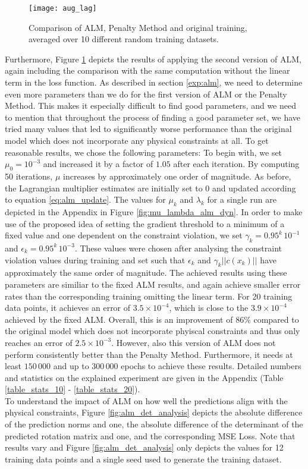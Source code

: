 \begin{figure}[H]
	\texttt{[image: aug\_lag]}
	\caption{Comparison of ALM, Penalty Method and original training, averaged over 10 different random training datasets.}
	\label{fig:aug_lag}
\end{figure}
Furthermore, Figure \ref{fig:aug_lag} depicts the results of applying the second version of ALM, again including the comparison with the same computation without the linear term in the loss function. As described in section \ref{exp:alm}, we need to determine even more parameters than we do for the first version of ALM or the Penalty Method. This makes it especially difficult to find good parameters, and we need to mention that throughout the process of finding a good parameter set, we have tried many values that led to significantly worse performance than the original model which does not incorporate any physical constraints at all. To get reasonable results, we chose the following parameters: To begin with, we set $\mu_{0} = 10^{-3}$ and increased it by a factor of $1.05$ after each iteration. By computing 50 iterations, $\mu$ increases by approximately one order of magnitude. As before, the Lagrangian multiplier estimates are initially set to $0$ and updated according to equation \eqref{eq:alm_update}. The values for $\mu_k$ and $\lambda_k$ for a single run are depicted in the Appendix in Figure \ref{fig:mu_lambda_alm_dyn}. In order to make use of the proposed idea of setting the gradient threshold to a minimum of a fixed value and one dependent on the constraint violation, we set $\gamma_k = 0.95^k\,10^{-1}$ and $\epsilon_k = 0.95^k\,10^{-3}$. These values were chosen after analysing the constraint violation values during training and set such that $\epsilon_k$ and $\gamma_k ||c(x_k)||$ have approximately the same order of magnitude. The achieved results using these parameters are similiar to the fixed ALM results, and again achieve smaller error rates than the corresponding training omitting the linear term. For 20 training data points, it achieves an error of $3.5\times 10^{-4}$, which is close to the $3.9 \times 10^{-4}$ achieved by the fixed ALM. Overall, this is an improvement of $86\%$ compared to the original model which does not incorporate phyiscal constraints and thus only reaches an error of $2.5\times 10^{-3}$. However, also this version of ALM does not perform consistently better than the Penalty Method. Furthermore, it needs at least $150\,000$ and up to $300\,000$ epochs to achieve these results. Detailed numbers and statistics on the explained experiment are given in the Appendix (Table \ref{table_stats_10} - \ref{table_stats_20}).\\
\indent To understand the impact of ALM on how well the predictions align with the physical constraints, Figure \ref{fig:alm_det_analysis} depicts the absolute difference of the prediction norms and one, the absolute difference of the determinant of the predicted rotation matrix and one, and the corresponding MSE Loss. Note that results vary and Figure \ref{fig:alm_det_analysis} only depicts the values for 12 training data points and a single seed used to generate the training dataset.

